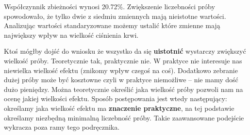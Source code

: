 \documentclass[
  openany]{book}
\begin{document}
\begin{example}
Współczynnik zbieżności wynosi 20.72\%. Zwiększenie
liczebności próby spowodowało, że tylko dwie z siedmiu zmiennych
mają nieistotne wartości. Analizując wartości standaryzowane możemy ustalić
które zmienne mają największy wpływ na wielkość ciśnienia krwi.

Ktoś mógłby dojść do wniosku że wszystko da się \textbf{uistotnić}
wystarczy zwiększyć wielkość próby. Teoretycznie tak, praktycznie nie.
W praktyce nie interesuje nas niewielka wielkość
efektu (znikomy wpływ czegoś na coś). Dodatkowo zebranie dużej próby może
być kosztowne czyli w praktyce niemożliwe -- nie mamy dość dużo pieniędzy.
Można teoretycznie określić jaka wielkość próby pozwoli nam na ocenę jakiej
wielkości efektu. Sposób postępowania jest wtedy następujący: określamy
jaka wielkość efektu ma \textbf{znaczenie praktyczne}, na tej podstawie określamy
niezbędną minimalną liczebność próby. Takie zaawansowane podejście
wykracza poza ramy tego podręcznika.
\end{example}
\end{document}
